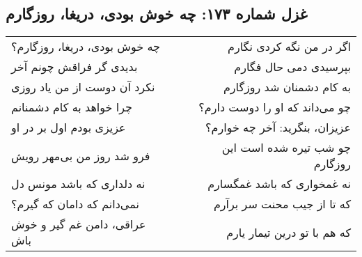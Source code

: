 \begin{center}
\section*{غزل شماره ۱۷۳: چه خوش بودی، دریغا، روزگارم}
\label{sec:173}
\begin{longtable}{l p{0.5cm} r}
چه خوش بودی، دریغا، روزگارم؟
&&
اگر در من نگه کردی نگارم
\\
بدیدی گر فراقش چونم آخر
&&
بپرسیدی دمی حال فگارم
\\
نکرد آن دوست از من یاد روزی
&&
به کام دشمنان شد روزگارم
\\
چرا خواهد به کام دشمنانم
&&
چو می‌داند که او را دوست دارم؟
\\
عزیزی بودم اول بر در او
&&
عزیزان، بنگرید: آخر چه خوارم؟
\\
فرو شد روز من بی‌مهر رویش
&&
چو شب تیره شده است این روزگارم
\\
نه دلداری که باشد مونس دل
&&
نه غمخواری که باشد غمگسارم
\\
نمی‌دانم که دامان که گیرم؟
&&
که تا از جیب محنت سر برآرم
\\
عراقی، دامن غم گیر و خوش باش
&&
که هم با تو درین تیمار یارم
\\
\end{longtable}
\end{center}
